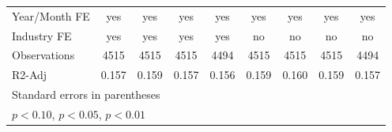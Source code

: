 {\begin{tabular}{l*{8}{c}}
\hline
Year/Month FE       &         yes         &         yes         &         yes         &         yes         &         yes         &         yes         &         yes         &         yes         \\
Industry FE         &         yes         &         yes         &         yes         &         yes         &          no         &          no         &          no         &          no         \\
Observations        &        4515         &        4515         &        4515         &        4494         &        4515         &        4515         &        4515         &        4494         \\
R2-Adj              &       0.157         &       0.159         &       0.157         &       0.156         &       0.159         &       0.160         &       0.159         &       0.157         \\
\hline\hline
\multicolumn{9}{l}{\footnotesize Standard errors in parentheses}\\
\multicolumn{9}{l}{\footnotesize \sym{*} \(p<0.10\), \sym{**} \(p<0.05\), \sym{***} \(p<0.01\)}\\
\end{tabular}
}
